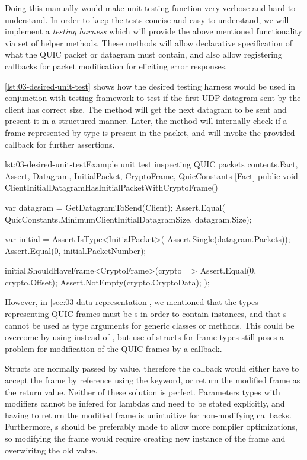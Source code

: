 Doing this manually would make unit testing function very verbose and hard to understand. In order
to keep the tests concise and easy to understand, we will implement a \textit{testing harness} which
will provide the above mentioned functionality via set of helper methods. These methods will allow
declarative specification of what the QUIC packet or datagram must contain, and also allow
registering callbacks for packet modification for eliciting error responses.

\autoref{lst:03-desired-unit-test} shows how the desired testing harness would be used in
conjunction with  testing framework to test if the first UDP datagram sent by the
client has correct size. The  method will get the next datagram to be sent
and present it in a structured manner. Later, the  method
will internally check if a frame represented by  type is present in the packet, and
will invoke the provided callback for further assertions.

\begin{myListing}{lst:03-desired-unit-test}{Example unit test inspecting QUIC packets contents.}{Fact, Assert, Datagram, InitialPacket, CryptoFrame, QuicConstants}{}
    [Fact]
    public void ClientInitialDatagramHasInitialPacketWithCryptoFrame()
    {
        var datagram = GetDatagramToSend(Client);
        Assert.Equal(
            QuicConstants.MinimumClientInitialDatagramSize,
            datagram.Size);

        var initial = Assert.IsType<InitialPacket>(
            Assert.Single(datagram.Packets));
        Assert.Equal(0, initial.PacketNumber);

        initial.ShouldHaveFrame<CryptoFrame>(crypto =>
        {
            Assert.Equal(0, crypto.Offset);
            Assert.NotEmpty(crypto.CryptoData);
        });
    }
\end{myListing}

However, in \autoref{sec:03-data-representation}, we mentioned that the types representing QUIC
frames must be s in order to contain  instances, and that
s cannot be used as type arguments for generic classes or methods. This could be
overcome by using  instead of , but use of structs for frame types
still poses a problem for modification of the QUIC frames by a callback.

Structs are normally passed by value, therefore the callback would either have to accept the frame
by reference using the  keyword, or return the modified frame as the return value.
Neither of these solution is perfect. Parameters types with  modifiers cannot be
infered for lambdas and need to be stated explicitly, and having to return the modified frame is
unintuitive for non-modifying callbacks. Furthermore, s should be preferably made
 to allow more compiler optimizations, so modifying the frame would require creating new instance of the frame and overwiritng the old value.

